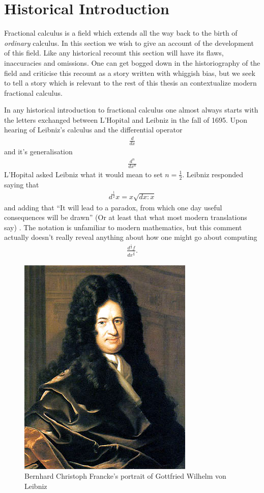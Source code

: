 \section{Historical Introduction}
Fractional calculus is a field which extends all the way back to the birth of \emph{ordinary} calculus. In this section we wish to give an account of the development of this field. Like any historical recount this section will have its flaws, inaccuracies and omissions. One can get bogged down in the historiography of the field and criticise this recount as a story written with whiggish bias, but we seek to tell a story which is relevant to the rest of this thesis an contextualize modern fractional calculus.

In any historical introduction to fractional calculus one almost always starts with the letters exchanged between L'Hopital and Leibniz in the fall of 1695. Upon hearing of Leibniz's calculus and the differential operator
\begin{align}
    \frac{d}{dx}
\end{align}
and it's generalisation
\begin{align}
    \frac{d^n}{dx^n}
\end{align}
L'Hopital asked Leibniz what it would mean to set $ n = \frac{1}{2} $. Leibniz responded saying that 
\begin{align}
    d^\frac{1}{2}x = x\sqrt{dx:x}
\end{align} and adding that
``It will lead to a paradox, from which one day useful consequences will be drawn'' (Or at least that what most modern translations say) \cite{Abbas2012}. The notation is unfamiliar to modern mathematics, but this comment actually doesn't really reveal anything about how one might go about computing
\begin{align}
    \frac{d^\frac{1}{2}f}{dx^\frac{1}{2}}.
\end{align}

\begin{figure}
    \includegraphics[scale=0.4]{images/Gottfried_Wilhelm_von_Leibniz}
    \caption{Bernhard Christoph Francke's portrait of Gottfried Wilhelm von Leibniz}
\end{figure}

